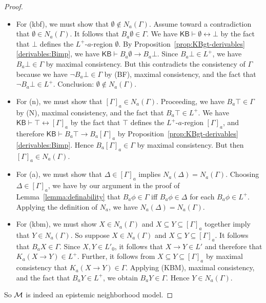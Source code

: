 \documentclass[12pt]{article}
\theoremstyle{definition}
\newcommand{\M}{{\cal M}}      %
\newcommand{\KB}{{\mathsf{KB}}}                        %
\begin{document}
\begin{proof}
\begin{itemize}
  \item For (kbf), we must show that $\emptyset\notin N_a(\Gamma)$.
    Assume toward a contradiction that $\emptyset\in N_a(\Gamma)$.
    It follows that $B_a\emptyset\in\Gamma$.
    We have $\KB\vdash\emptyset\leftrightarrow\bot$ by the fact that
    $\bot$ defines the $L^+$-$a$-region $\emptyset$.
    By Proposition~\ref{prop:KBgt-derivables}\eqref{derivables:Bimp},
    we have
    $\KB\vdash B_a\emptyset\to B_a\bot$.  Since $B_a\bot\in L^+$, we have
    $B_a\bot\in\Gamma$ by maximal consistency.  But this
    contradicts the consistency of $\Gamma$ because we have
    $\lnot B_a\bot\in\Gamma$ by (BF), maximal consistency, and the fact that
    $\lnot B_a\bot\in L^+$.
    Conclusion: $\emptyset\notin N_a(\Gamma)$.

  \item For (n), we must show that $[\Gamma]_a\in N_a(\Gamma)$.
    Proceeding, we have $B_a\top\in\Gamma$ by (N), maximal consistency, and the
    fact that $B_a\top\in L^+$.
    We have $\KB\vdash\top\leftrightarrow[\Gamma]_a$ by the fact that
    $\top$ defines the $L^+$-$a$-region $[\Gamma]_a$, and therefore
    $\KB\vdash B_a\top\to B_a[\Gamma]_a$ by Proposition~\ref{prop:KBgt-derivables}\eqref{derivables:Bimp}.
    Hence
    $B_a[\Gamma]_a\in\Gamma$ by maximal consistency.  But then
    $[\Gamma]_a\in N_a(\Gamma)$.

  \item For (a), we must show that $\Delta\in[\Gamma]_a$ implies
    $N_a(\Delta)=N_a(\Gamma)$.  Choosing $\Delta\in[\Gamma]_a$, we have by
    our argument in the proof of
    Lemma~\ref{lemma:definability} that
    $B_a\phi\in\Gamma$ iff $B_a\phi\in\Delta$ for each $B_a\phi\in L^+$.
    Applying the definition of $N_a$, we have $N_a(\Delta)=N_a(\Gamma)$.

  \item For (kbm), we must show $X\in N_a(\Gamma)$ and $X\subseteq
    Y\subseteq[\Gamma]_a$ together imply that $Y\in
    N_a(\Gamma)$. So suppose $X\in N_a(\Gamma)$ and $X\subseteq
    Y\subseteq[\Gamma]_a$.  It follows that $B_aX\in\Gamma$.
    Since $X,Y\in L'_0$, it follows that
    $X\to Y\in L'$ and therefore that $K_a(X\to Y)\in L^+$.
    Further, it follows from $X\subseteq
    Y\subseteq[\Gamma]_a$ by maximal consistency that
    $K_a(X\to Y)\in\Gamma$.  Applying (KBM), maximal consistency, and the fact that
    $B_aY\in L^+$, we obtain $B_aY\in\Gamma$.
    Hence $Y\in N_a(\Gamma)$.
  \end{itemize}
  So $\M$ is indeed an epistemic neighborhood model.  


\end{proof}
\end{document}
